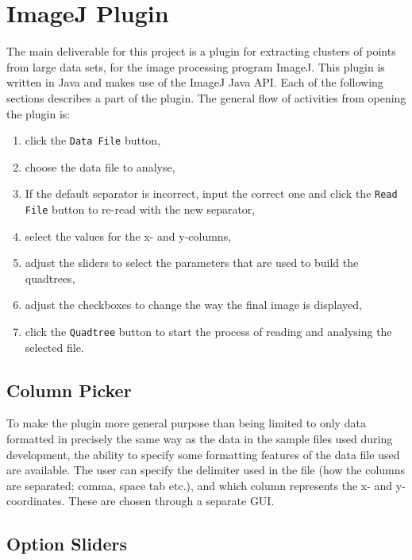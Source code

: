 
\section{ImageJ Plugin}
\label{sec:imagej_plugin}

The main deliverable for this project is a plugin for extracting clusters of
points from large data sets, for the image processing program ImageJ. This
plugin is written in Java and makes use of the ImageJ Java API\cite{imagejapi}.
Each of the following sections describes a part of the plugin. The general flow
of activities from opening the plugin is:

\begin{enumerate}
	\item click the \texttt{Data File} button,
	\item choose the data file to analyse,
	\item If the default separator is incorrect, input the correct one and
		click the \texttt{Read File} button to re-read with the new separator,
	\item select the values for the x- and y-columns,
	\item adjust the sliders to select the parameters that are used to build
		the quadtrees,
	\item adjust the checkboxes to change the way the final image is displayed,
	\item click the \texttt{Quadtree} button to start the process of reading
		and analysing the selected file.
\end{enumerate}

\subsection{Column Picker}
\label{sub:column_picker}

To make the plugin more general purpose than being limited to only data
formatted in precisely the same way as the data in the sample files used during
development, the ability to specify some formatting features of the data file
used are available. The user can specify the delimiter used in the file (how
the columns are separated; comma, space tab etc.), and which column represents
the x- and y-coordinates. These are chosen through a separate GUI\@.

\subsection{Option Sliders}
\label{sub:option_sliders}

